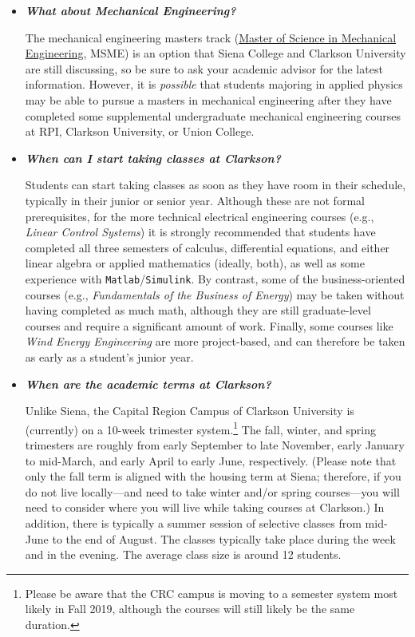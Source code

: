 \documentclass[12pt]{article}
\begin{document}
\begin{itemize}
\item{{\bf {\em What about Mechanical Engineering?}}

The mechanical engineering masters track (\ul{Master of Science in Mechanical
  Engineering}, MSME) is an option that Siena College and Clarkson University
are still discussing, so be sure to ask your academic advisor for the latest
information.  However, it is \emph{possible} that students majoring in applied
physics may be able to pursue a masters in mechanical engineering after they
have completed some supplemental undergraduate mechanical engineering courses at
RPI, Clarkson University, or Union College.}


\item{{\bf {\em When can I start taking classes at Clarkson?}}

Students can start taking classes as soon as they have room in their schedule,
typically in their junior or senior year.  Although these are not formal
prerequisites, for the more technical electrical engineering courses (e.g., {\em
  Linear Control Systems}) it is strongly recommended that students have
completed all three semesters of calculus, differential equations, and either
linear algebra or applied mathematics (ideally, both), as well as some
experience with {\tt Matlab}/{\tt Simulink}.  By contrast, some of the
business-oriented courses (e.g., {\em Fundamentals of the Business of Energy})
may be taken without having completed as much math, although they are still
graduate-level courses and require a significant amount of work.  Finally, some
courses like {\em Wind Energy Engineering} are more project-based, and can
therefore be taken as early as a student's junior year.}

\item{{\bf {\em When are the academic terms at Clarkson?}}

Unlike Siena, the Capital Region Campus of Clarkson University is (currently) on
a 10-week trimester system.\footnote{Please be aware that the CRC campus is
  moving to a semester system most likely in Fall 2019, although the courses
  will still likely be the same duration.}  The fall, winter, and spring
trimesters are roughly from early September to late November, early January to
mid-March, and early April to early June, respectively.  (Please note that only
the fall term is aligned with the housing term at Siena; therefore, if you do
not live locally---and need to take winter and/or spring courses---you will need
to consider where you will live while taking courses at Clarkson.)  In addition,
there is typically a summer session of selective classes from mid-June to the
end of August.  The classes typically take place during the week and in the
evening.  The average class size is around 12 students.}


\end{itemize}
\end{document}
